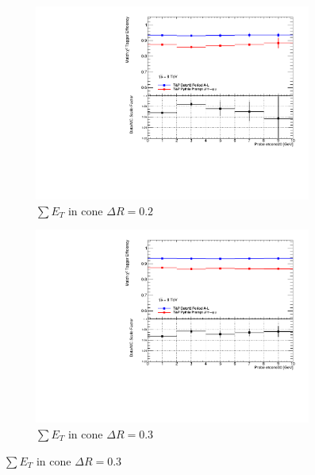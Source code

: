 \begin{figure}[phtb]
  \centering
    \begin{subfigure}[b]{0.55\textwidth}
      \includegraphics[width=\textwidth]{PartCalibration2012/Plots/SFPlots/etcone20_smt.pdf}
      \caption{$\sum E_{T}$ in cone $\Delta R=0.2$} \label{fig:CalibrationIsoEtcone20}
    \end{subfigure}
    
    \begin{subfigure}[b]{0.55\textwidth}
      \includegraphics[width=\textwidth]{PartCalibration2012/Plots/SFPlots/etcone30_smt.pdf}
      \caption{$\sum E_{T}$ in cone $\Delta R=0.3$} \label{fig:CalibrationIsoEtcone30}
    \end{subfigure}


\end{figure}
